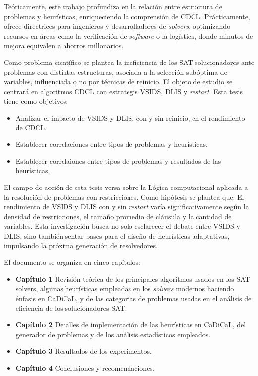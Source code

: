 Teóricamente, este trabajo profundiza en la relación entre estructura de problemas y heurísticas, enriqueciendo la comprensión de CDCL. Prácticamente, ofrece directrices para ingenieros y desarrolladores de \textit{solvers}, optimizando recursos en áreas como la verificación de \textit{software} o la logística, donde minutos de mejora equivalen a ahorros millonarios.

Como problema científico se plantea la ineficiencia de los SAT solucionadores ante problemas con distintas estructuras, asociada a la selección subóptima de variables, influenciada o no por t\'ecnicas de reinicio. El objeto de estudio se centrar\'a en algoritmos CDCL con estrategis VSIDS, DLIS y \textit{restart}. Esta tesis tiene como objetivos:
\begin{itemize}
    \item Analizar el impacto de VSIDS y DLIS, con y sin reinicio, en el rendimiento de CDCL.
    \item Establecer correlaciones entre tipos de problemas y heurísticas.
    \item Establecer correlaiones entre tipos de problemas y resultados de las heur\'isticas.
\end{itemize}
El campo de acci\'on de esta tesis versa sobre la Lógica computacional aplicada a la resolución de problemas con restricciones.
Como hipótesis se plantea que: El rendimiento de VSIDS y DLIS con y sin \textit{restart} varía significativamente según la densidad de restricciones, el tama\~no promedio de cl\'ausula y la cantidad de variables.
Esta investigación busca no solo esclarecer el debate entre VSIDS y DLIS, sino también sentar bases para el diseño de heurísticas adaptativas, impulsando la próxima generación de resolvedores.

El documento se organiza en cinco capítulos:
\begin{itemize}
    \item \textbf{Cap\'itulo 1} Revisión teórica de los principales algoritmos usados en los SAT solvers, algunas heur\'isticas empleadas en los \textit{solvers} modernos haciendo \'enfasis en CaDiCaL, y de las categor\'ias de problemas usadas en el an\'alisis de eficiencia de los solucionadores SAT.
    \item \textbf{Cap\'itulo 2} Detalles de implementaci\'on de las heur\'isticas en CaDiCaL, del generador de problemas y de los an\'alisis estad\'isticos empleados.
    \item \textbf{Cap\'itulo 3} Resultados de los experimentos.
    \item \textbf{Cap\'itulo 4} Conclusiones y recomendaciones.
\end{itemize}


